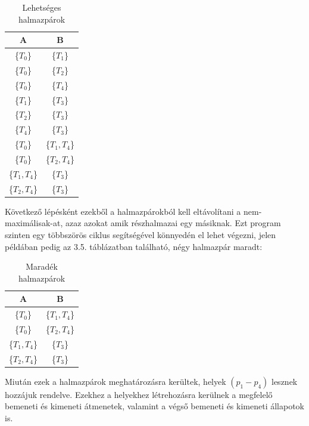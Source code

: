 \begin{example}
	\begin{table}[h]
	\begin{center}
	\caption{Lehetséges halmazpárok}
	\begin{tabular}{|| c | c ||}
		\hline
		A & B \\
		\hline\hline
		\{$T_0$\} & \{$T_1$\} \\
		\hline
		\{$T_0$\} & \{$T_2$\} \\
		\hline
		\{$T_0$\} & \{$T_4$\} \\
		\hline
		\{$T_1$\} & \{$T_3$\} \\
		\hline
		\{$T_2$\} & \{$T_3$\} \\
		\hline
		\{$T_4$\} & \{$T_3$\} \\
		\hline
		\{$T_0$\} & \{$T_1, T_4$\} \\
		\hline
		\{$T_0$\} & \{$T_2, T_4$\} \\
		\hline
		\{$T_1, T_4$\} & \{$T_3$\} \\
		\hline
		\{$T_2, T_4$\} & \{$T_3$\} \\
		\hline
	\end{tabular}
	\label{fig:planexample}
	\end{center}
	\end{table}	

	Következő lépésként ezekből a halmazpárokból kell eltávolítani a nem-maximálisak\hyp{}at, azaz azokat amik részhalmazai egy másiknak. Ezt program szinten egy többszörös ciklus segítségével könnyedén el lehet végezni, jelen példában pedig az 3.5. táblázatban található, négy halmazpár maradt:
	
	\begin{table}[h]
	\begin{center}
	\caption{Maradék halmazpárok}
	\begin{tabular}{|| c | c ||}
		\hline
		A & B \\
		\hline\hline
		\{$T_0$\} & \{$T_1, T_4$\} \\
		\hline
		\{$T_0$\} & \{$T_2, T_4$\} \\
		\hline
		\{$T_1, T_4$\} & \{$T_3$\} \\
		\hline
		\{$T_2, T_4$\} & \{$T_3$\} \\
		\hline
	\end{tabular}
	\label{fig:planexample}
	\end{center}
	\end{table}

	Miután ezek a halmazpárok meghatározásra kerültek, helyek $(p_1-p_4)$  lesznek hozzájuk rendelve. Ezekhez a helyekhez létrehozásra kerülnek a megfelelő bemeneti és kimeneti átmenetek, valamint a végső bemeneti és kimeneti állapotok is.


\end{example}
